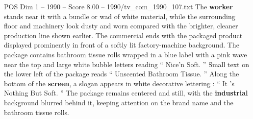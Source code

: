 \begin{textsample}{POS Dim 1 – 1990 – Score 8.00 – 1990/tv\_com\_1990\_107.txt}
The \textbf{worker} stands near it with a bundle or wad of white material, while the surrounding floor and machinery look dusty and worn compared with the brighter, cleaner production line shown earlier.
The commercial ends with the packaged product displayed prominently in front of a softly lit factory-machine background.
The package contains bathroom tissue rolls wrapped in a blue label with a pink wave near the top and large white bubble letters reading “ Nice’n Soft. ” Small text on the lower left of the package reads “ Unscented Bathroom Tissue. ” Along the bottom of the \textbf{screen}, a slogan appears in white decorative lettering : “ It ’s Nothing But Soft. ” The package remains centered and still, with the \textbf{industrial} background blurred behind it, keeping attention on the brand name and the bathroom tissue rolls.

\end{textsample}
